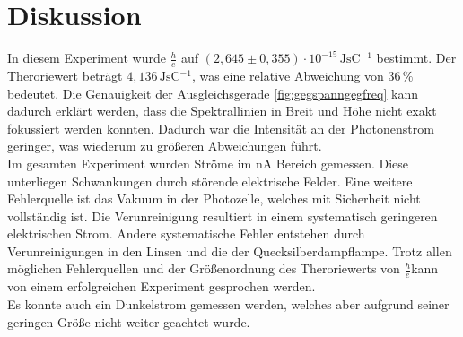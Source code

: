 \section{Diskussion}
\label{sec:Diskussion}

In diesem Experiment wurde $ \frac{h}{e}$ auf $(2,645 \pm 0,355) \cdot 10^{-15} \,\si{\joule\second\coulomb^{-1}}$ bestimmt.
Der Theroriewert beträgt $4,136 \,\si{\joule\second\coulomb^{-1}}$, was eine relative Abweichung von $36 \, \%$ bedeutet. Die Genauigkeit der Ausgleichsgerade \autoref{fig:gegspanngegfreq} kann dadurch erklärt werden, dass die Spektrallinien in Breit und Höhe nicht exakt fokussiert werden konnten.
Dadurch war die Intensität an der Photonenstrom geringer, was wiederum zu größeren Abweichungen führt. \\

Im gesamten Experiment wurden Ströme im $ \unit{\nano\ampere}$ Bereich gemessen. Diese unterliegen Schwankungen durch störende elektrische Felder.
Eine weitere Fehlerquelle ist das Vakuum in der Photozelle, welches mit Sicherheit nicht vollständig ist. Die Verunreinigung resultiert in einem systematisch geringeren elektrischen Strom.
Andere systematische Fehler entstehen durch Verunreinigungen in den Linsen und die der Quecksilberdampflampe. Trotz allen möglichen Fehlerquellen und der Größenordnung des Theroriewerts von $\frac{h}{e} $kann von einem erfolgreichen Experiment gesprochen werden. \\
Es konnte auch ein Dunkelstrom gemessen werden, welches aber aufgrund seiner geringen Größe nicht weiter geachtet wurde.\\